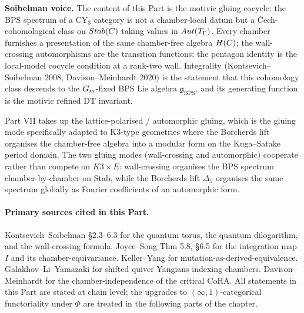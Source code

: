 \bigskip
\noindent \textbf{Soibelman voice.} The content of this Part is the
motivic gluing cocycle: the BPS spectrum of a CY$_3$ category is not a
chamber-local datum but a \v{C}ech-cohomological class on $Stab(C)$
taking values in $Aut(T_\Gamma)$. Every chamber furnishes a
presentation of the same chamber-free algebra $H(C)$; the
wall-crossing automorphisms are the transition functions; the pentagon
identity is the local-model cocycle condition at a rank-two wall.
Integrality (Kontsevich--Soibelman 2008, Davison--Meinhardt 2020) is
the statement that this cohomology class descends to the $G_m$-fixed
BPS Lie algebra $\mathfrak{g}_{\mathrm{BPS}}$, and its generating function is the
motivic refined DT invariant.

Part VII takes up the lattice-polarised / automorphic gluing, which is the
gluing mode specifically adapted to K3-type geometries where the Borcherds
lift organises the chamber-free algebra into a modular form on the
Kuga--Satake period domain. The two gluing modes (wall-crossing and
automorphic) cooperate rather than compete on $K3 \times E$: wall-crossing
organises the BPS spectrum chamber-by-chamber on Stab, while the Borcherds
lift $\Delta_5$ organises the same spectrum globally as Fourier coefficients
of an automorphic form.

\bigskip
\paragraph{Primary sources cited in this Part.}
Kontsevich--Soibelman \cite{KS2008} \S 2.3--6.3 for the quantum torus, the
quantum dilogarithm, and the wall-crossing formula. Joyce--Song
\cite{JoyceSong2012} Thm 5.8, \S 6.5 for the integration map $I$ and its
chamber-equivariance. Keller--Yang \cite{KellerYang2011} for
mutation-as-derived-equivalence. Galakhov--Li--Yamazaki
\cite{GalakhovLiYamazaki2021} for shifted quiver Yangians indexing
chambers. Davison--Meinhardt \cite{DavisonMeinhardt2020} for the
chamber-independence of the critical CoHA. All statements in this Part are
stated at chain level; the upgrades to $(\infty, 1)$-categorical functoriality
under $\Phi$ are treated in the following parts of the chapter.
